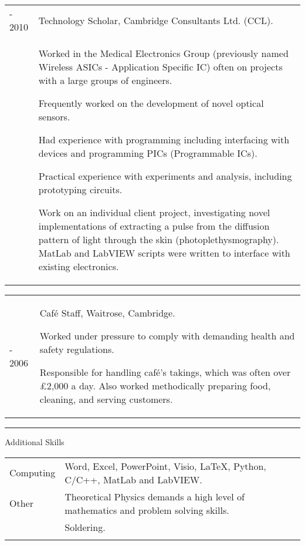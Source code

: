 \begin{tablehere}
  \begin{tabular}{p{\wa\textwidth} p{\wb\textwidth}}
    \sc 2006 - 2010	&	\sc Technology Scholar, Cambridge Consultants Ltd. (CCL).\\
    &	Worked in the Medical Electronics Group (previously named Wireless ASICs - Application Specific IC) often on projects with a large groups of engineers.
    \begin{list}{}{\leftmargin=1em}
    \item Frequently worked on the development of novel optical sensors.
    \item Had experience with programming including interfacing with devices and programming PICs (Programmable ICs).
    \item Practical experience with experiments and analysis, including prototyping circuits.
    \item Work on an individual client project, investigating novel implementations of extracting a pulse from the diffusion pattern of light through the skin (photoplethysmography).  MatLab and LabVIEW scripts were written to interface with existing electronics.
    \end{list}
  \end{tabular}
\end{tablehere}

\begin{tablehere}
  \begin{tabular}{p{\wa\textwidth} p{\wb\textwidth}}
    \sc 2004 - 2006	&	{\sc Caf\'e Staff, Waitrose, Cambridge.}
    \begin{list}{}{\leftmargin=1em}
    \item Worked under pressure to comply with demanding health and safety regulations.
    \item Responsible for handling caf\'e's takings, which was often over \pounds2,000 a day.  Also worked methodically preparing food, cleaning, and serving customers.
    \end{list}
  \end{tabular}
\end{tablehere}



\hrule\vspace{0.2cm}
\sc Additional Skills \rm

\begin{tablehere}
  \begin{tabular}{p{\wa\textwidth} p{\wb\textwidth}}
    \sc Computing	&	Word, Excel, PowerPoint, Visio, LaTeX, Python, C/C++, MatLab and LabVIEW.\\%
    \sc Other		&	Theoretical Physics demands a high level of mathematics and problem solving skills.	\\
    &	Soldering.																\\\\
  \end{tabular}
\end{tablehere}


